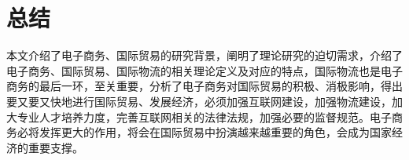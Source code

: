 \chapter{总结}
本文介绍了电子商务、国际贸易的研究背景，阐明了理论研究的迫切需求，介绍了电子商务、国际贸易、国际物流的相关理论定义及对应的特点，国际物流也是电子商务的最后一环，至关重要，分析了电子商务对国际贸易的积极、消极影响，得出要又要又快地进行国际贸易、发展经济，必须加强互联网建设，加强物流建设，加大专业人才培养力度，完善互联网相关的法律法规，加强必要的监督规范。电子商务必将发挥更大的作用，将会在国际贸易中扮演越来越重要的角色，会成为国家经济的重要支撑。